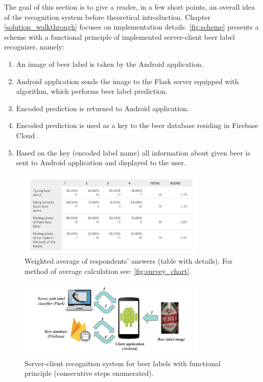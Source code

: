 \documentclass[11pt]{article}
\begin{document}
The goal of this section is to give a reader, in a few short points, an overall idea of the recognition system before theoretical introduction. Chapter \ref{solution_walkthrough} focuses on implementation details. \autoref{fig:scheme} presents a scheme with a functional principle of implemented server-client beer label recognizer, namely:
\begin{enumerate}
\item An image of beer label is taken by the Android \cite{android_guide} application. 
\item Android application sends the image to the Flask \cite{flask_docs} server equipped with algorithm, which performs beer label prediction.
\item Encoded prediction is returned to Android application.
\item Encoded prediction is used as a key to the beer database residing in Firebase Cloud \cite{firebase_database_docs}.
\item Based on the key (encoded label name) all information about given beer is sent to Android application and displayed to the user.
\end{enumerate}

\begin{figure}[h]
\includegraphics[width=0.8\textwidth]{survey_table}
\centering
\caption{Weighted average of respondents' answers (table with details). For method of average calculation see: \autoref{fig:survey_chart}.}
\label{fig:survey_table}
\end{figure}

\begin{figure}[h]
\includegraphics[width=0.8\textwidth]{scheme}
\centering
\caption{Server-client recognition system for beer labels with functional principle (consecutive steps enumerated).}
\label{fig:scheme}
\end{figure}
\clearpage
\end{document}

